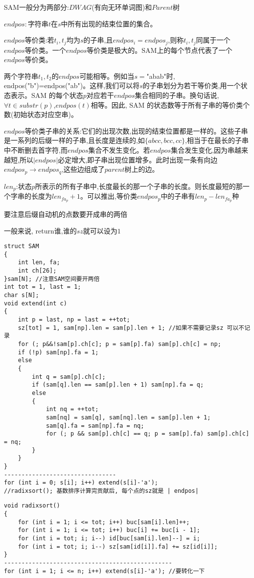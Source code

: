 \documentclass[a4paper, fontset=none]{ctexart}
\begin{document}
SAM一般分为两部分:$DWAG$(有向无环单词图)和$Parent$树

$endpos:$字符串$t$在$s$中所有出现的结束位置的集合。

$endpos$等价类:若$t_i, t_j$均为$s$的子串,且$endpos_i=endpos_j$,则称$t_i, t_j$同属于一个$endpos$等价类。一个$endpos$等价类是极大的。SAM上的每个节点代表了一个$endpos$等价类。

两个字符串$t_1, t_2$的$endpos$可能相等。例如当$s=$"abab"时, endpos("b")=endpos("ab")。这样,我们可以将$s$的子串划分为若干等价类,用一个状态表示。SAM 的每个状态$p$对应若干$endpos$集合相同的子串。换句话说,$∀t∈substr(p)$,$endpos(t)$相等。因此, SAM 的状态数等于所有子串的等价类个数(初始状态对应空串)。

$endpos$等价类子串的关系:它们的出现次数,出现的结束位置都是一样的。这些子串是一系列的后缀一样的子串,且长度是连续的,如$\{abcc, bcc, cc\}$,相当于在最长的子串中不断删去首字符,而$endpos$集合不发生变化。若$endpos$集合发生变化,因为串越来越短,所以$|endpos|$必定增大,即子串出现位置增多。此时出现一条有向边$endpos_p\rightarrow endpos_q$,这些边组成了$parent$树上的边。

$len_p$:状态$p$所表示的所有子串中,长度最长的那一个子串的长度。则长度最短的那一个字串的长度为$len_{fa_p}+1$。可以推出,等价类$endpos_p$中的子串有$len_p-len_{fa_p}$种

要注意后缀自动机的点数要开成串的两倍

一般来说, return谁,谁的$sz$就可以设为$1$

\begin{verbatim}
struct SAM
{
    int len, fa;
    int ch[26];
}sam[N]; //注意SAM空间要开两倍
int tot = 1, last = 1;
char s[N];
void extend(int c)
{
    int p = last, np = last = ++tot;
    sz[tot] = 1, sam[np].len = sam[p].len + 1; //如果不需要记录sz 可以不记录
    for (; p&&!sam[p].ch[c]; p = sam[p].fa) sam[p].ch[c] = np;
    if (!p) sam[np].fa = 1;
    else
    {
        int q = sam[p].ch[c];
        if (sam[q].len == sam[p].len + 1) sam[np].fa = q;
        else
        {
            int nq = ++tot;
            sam[nq] = sam[q], sam[nq].len = sam[p].len + 1;
            sam[q].fa = sam[np].fa = nq;
            for (; p && sam[p].ch[c] == q; p = sam[p].fa) sam[p].ch[c] = nq;
        }
    }
}
--------------------------------
for (int i = 0; s[i]; i++) extend(s[i]-'a');
//radixsort(); 基数排序计算完贡献后, 每个点的sz就是 | endpos|
\end{verbatim}

\begin{verbatim}
void radixsort()
{
    for (int i = 1; i <= tot; i++) buc[sam[i].len]++;
    for (int i = 1; i <= tot; i++) buc[i] += buc[i - 1];
    for (int i = tot; i; i--) id[buc[sam[i].len]--] = i;
    for (int i = tot; i; i--) sz[sam[id[i]].fa] += sz[id[i]];
}
------------------------------------------------
for (int i = 1; i <= n; i++) extend(s[i]-'a'); //要转化一下
\end{verbatim}
\end{document}
